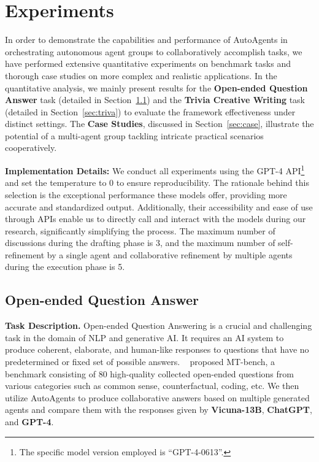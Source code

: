 \section{Experiments}

In order to demonstrate the capabilities and performance of AutoAgents in orchestrating autonomous agent groups to collaboratively accomplish tasks, we have performed extensive quantitative experiments on benchmark tasks and thorough case studies on more complex and realistic applications. In the quantitative analysis, we mainly present results for the \textbf{Open-ended Question Answer} task (detailed in Section~\ref{sec:qa}) and the \textbf{Trivia Creative Writing} task (detailed in Section~\ref{sec:triva}) to evaluate the framework effectiveness under distinct settings. The \textbf{Case Studies}, discussed in Section~\ref{sec:case}, illustrate the potential of a multi-agent group tackling intricate practical scenarios cooperatively.

\textbf{Implementation Details:} We conduct all experiments using the GPT-4 API\footnote{The specific model version employed is “GPT-4-0613”.} and set the temperature to 0 to ensure reproducibility. The rationale behind this selection is the exceptional performance these models offer, providing more accurate and standardized output. Additionally, their accessibility and ease of use through APIs enable us to directly call and interact with the models during our research, significantly simplifying the process. The maximum number of discussions during the drafting phase is 3, and the maximum number of self-refinement by a single agent and collaborative refinement by multiple agents during the execution phase is 5.

\subsection{Open-ended Question Answer}
\label{sec:qa}

\textbf{Task Description.} Open-ended Question Answering is a crucial and challenging task in the domain of NLP and generative AI. It requires an AI system to produce coherent, elaborate, and human-like responses to questions that have no predetermined or fixed set of possible answers. ~\cite{zheng2023judging} proposed MT-bench, a benchmark consisting of 80 high-quality collected open-ended questions from various categories such as common sense, counterfactual, coding, etc. We then utilize AutoAgents to produce collaborative answers based on multiple generated agents and compare them with the responses given by \textbf{Vicuna-13B}, \textbf{ChatGPT}, and \textbf{GPT-4}.

